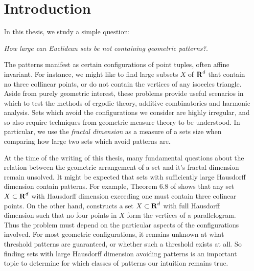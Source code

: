 
\chapter{Introduction}
\label{ch:Introduction}

In this thesis, we study a simple question:
%
\begin{center}
	{\it How large can Euclidean sets be not containing geometric patterns?}.
\end{center}
%
The patterns manifest as certain configurations of point tuples, often affine invariant. For instance, we might like to find large subsets $X$ of $\operatorname{\mathbf{R}}^d$ that contain no three collinear points, or do not contain the vertices of any isoceles triangle. Aside from purely geometric interest, these problems provide useful scenarios in which to test the methods of ergodic theory, additive combinatorics and harmonic analysis. Sets which avoid the configurations we consider are highly irregular, and so also require techniques from geometric measure theory to be understood. In particular, we use the \emph{fractal dimension} as a measure of a sets size when comparing how large two sets which avoid patterns are.



At the time of the writing of this thesis, many fundamental questions about the relation between the geometric arrangement of a set and it's fractal dimension remain unsolved. It might be expected that sets with sufficiently large Hausdorff dimension contain patterns. For example, Theorem 6.8 of \cite{Matilla} shows that any set $X \subset \operatorname{\mathbf{R}}^d$ with Hausdorff dimension exceeding one must contain three colinear points. On the other hand, \cite{Maga} constructs a set $X \subset \operatorname{\mathbf{R}}^d$ with full Hausdorff dimension such that no four points in $X$ form the vertices of a parallelogram. Thus the problem must depend on the particular aspects of the configurations involved. For most geometric configurations, it remains unknown at what threshold patterns are guaranteed, or whether such a threshold exists at all. So finding sets with large Hausdorff dimension avoiding patterns is an important topic to determine for which classes of patterns our intuition remains true.

